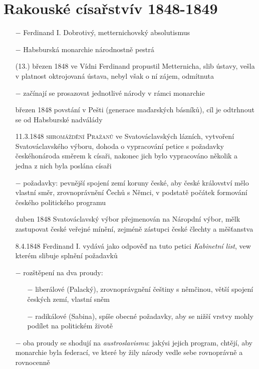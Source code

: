 \documentclass{article}
\begin{document}
\section*{Rakouské císařstvív 1848-1849}
\begin{itemize}
    \vspace{-0.5em}
    \setlength\itemsep{0.15em}
    \item[$-$] Ferdinand I. Dobrotivý, metternichovský absolutismus
    \item[$-$] Habsburská monarchie národnostně pestrá
    \item[(13.) březen 1848] ve Vídni Ferdinand propustil Metternicha, slib ústavy, vešla v platnost oktrojovaná ústava, nebyl však o ní zájem, odmítnuta
    \item[$-$] začínají se prosazovat jednotlivé národy v rámci monarchie
    \item[březen 1848] povstání v Pešti (generace maďarských básníků), cíl je odtrhnout se od Habsburské nadválády
    \item[11.3.1848] \textsc{shromáždění Pražanů} ve Svatováclavských lázních, vytvoření Svatováclavského výboru, dohoda o vypracování petice s požadavky českéhonároda směrem k císaři, nakonec jich bylo vypracováno několik a jedna z nich byla poslána císaři
    \item[$-$] požadavky: pevnější spojení zemí koruny české, aby české království mělo vlastní směr, zrovnoprávnění Čechů s Němci, v podstatě počátek formování českého politického programu
    \item[duben 1848] Svatováclavský výbor přejmenován  na Náropdní výbor, mělk zastupovat české veřejné mínění, zejméně zástupci české člechty a měšťanstva
    \item[8.4.1848] Ferdinand I. vydává jako odpověď na tuto petici \textit{Kabinetní list}, vew kterém slibuje splnění požadavků
    \item[$-$] rozštěpení na dva proudy:
    \begin{itemize}
        \vspace{-0.5em}
        \setlength\itemsep{0.15em}
        \item[$-$] liberálové (Palacký), zrovnoprávgnění češtiny s němčinou, větší spojení českých zemí, vlastní sněm
        \item[$-$] radikálové (Sabina), spíše obecné požadavky, aby se nižší vrstvy mohly podílet na politickém životě
    \end{itemize}
    \item[$-$] oba proudy se shodují na \textit{austroslavismu}: jakýsi jejich program, chtějí, aby monarchie byla federací, ve které by žily národy vedle sebe rovnoprávně a rovnocenně

\end{itemize}
\end{document}
